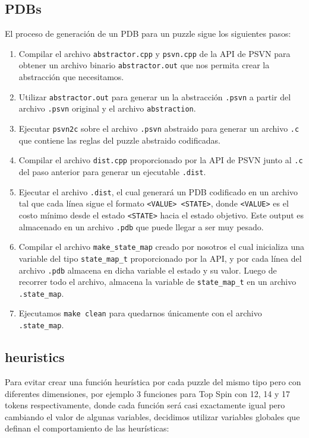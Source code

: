 \documentclass[a4paper,10pt]{article}
\begin{document}
  \subsection{PDBs}
    El proceso de generaci\'on de un PDB para un puzzle sigue los siguientes pasos:
    \begin{enumerate}
      \item Compilar el archivo \verb|abstractor.cpp| y \verb|psvn.cpp| de la API de 
      PSVN para obtener un archivo binario \verb|abstractor.out| que nos permita crear 
      la abstracci\'on que necesitamos.
      \item Utilizar \verb|abstractor.out| para generar un la abstracci\'on \verb|.psvn| 
      a partir del archivo \verb|.psvn| original y el archivo \verb|abstraction|.
      \item Ejecutar \verb|psvn2c| sobre el archivo \verb|.psvn| abstraido para generar 
      un archivo \verb|.c| que contiene las reglas del puzzle abstraido codificadas.
      \item Compilar el archivo \verb|dist.cpp| proporcionado por la API de PSVN junto 
      al \verb|.c| del paso anterior para generar un ejecutable \verb|.dist|.
      \item Ejecutar el archivo \verb|.dist|, el cual generar\'a un PDB codificado en 
      un archivo tal que cada l\'inea sigue el formato \verb|<VALUE> <STATE>|, donde 
      \verb|<VALUE>| es el costo m\'inimo desde el estado \verb|<STATE>| hacia el estado 
      objetivo. Este output es almacenado en un archivo \verb|.pdb| que puede llegar a 
      ser muy pesado.
      \item Compilar el archivo \verb|make_state_map| creado por nosotros el cual 
      inicializa una variable del tipo \verb|state_map_t| proporcionado por la API, y 
      por cada l\'inea del archivo \verb|.pdb| almacena en dicha variable el estado y 
      su valor. Luego de recorrer todo el archivo, almacena la variable de 
      \verb|state_map_t| en un archivo \verb|.state_map|.
      \item Ejecutamos \verb|make clean| para quedarnos \'unicamente con el archivo 
      \verb|.state_map|.
    \end{enumerate}

  \subsection{heuristics}
    Para evitar crear una funci\'on heur\'istica por cada puzzle del mismo tipo pero 
    con diferentes dimensiones, por ejemplo 3 funciones para Top Spin con 12, 14 y 17 
    tokens respectivamente, donde cada funci\'on ser\'a casi exactamente igual pero 
    cambiando el valor de algunas variables, decidimos utilizar variables globales 
    que definan el comportamiento de las heur\'isticas:
\end{document}
